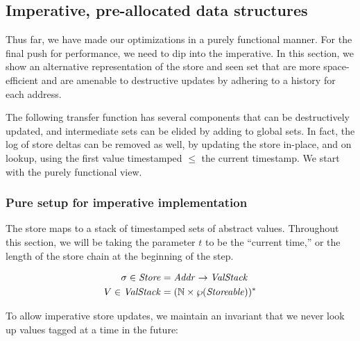\documentclass[9pt]{sigplanconf} %
\begin{document}


\subsection{Imperative, pre-allocated data structures}

Thus far, we have made our optimizations in a purely functional
manner. For the final push for performance, we need to dip into the
imperative. In this section, we show an alternative representation of
the store and seen set that are more space-efficient and are amenable
to destructive updates by adhering to a history for each address.

The following transfer function has several components that can be
destructively updated, and intermediate sets can be elided by adding
to global sets. In fact, the log of store deltas can be removed as
well, by updating the store in-place, and on lookup, using the first
value timestamped $\le$ the current timestamp. We start with the
purely functional view.

\subsubsection{Pure setup for imperative implementation}

The store maps to a stack of timestamped sets of abstract
values. Throughout this section, we will be taking the parameter $t$
to be the ``current time,'' or the length of the store chain at the
beginning of the step.

\begin{align*}
\sigma \in \mathit{Store} &= \mathit{Addr} \to \mathit{ValStack} \\
V \in \mathit{ValStack} &= ({\mathbb N} \times \wp(\mathit{Storeable}))^*
\end{align*}

To allow imperative store updates, we maintain an invariant that we never look up values tagged at a time in the future:
\end{document}
